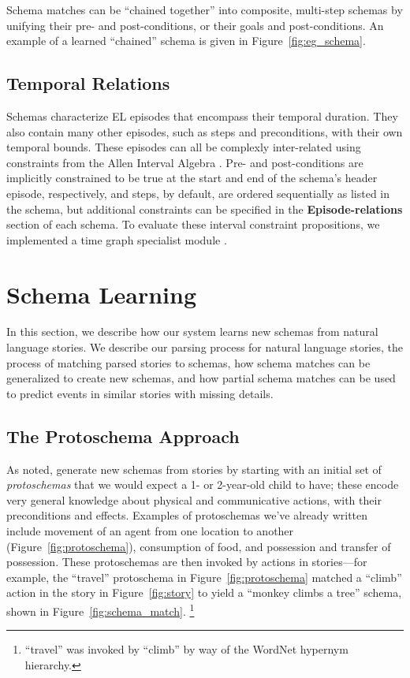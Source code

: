 Schema matches can be ``chained together'' into composite, multi-step schemas by unifying their pre- and post-conditions, or their goals and post-conditions. An example of a learned ``chained'' schema is given in Figure~\ref{fig:eg_schema}.

\subsection{Temporal Relations}
Schemas characterize EL episodes that encompass their temporal duration. They also contain many other episodes, such as steps and preconditions, with their own temporal bounds. These episodes can all be complexly inter-related using constraints from the Allen Interval Algebra \citep{allen1983maintaining}. Pre- and post-conditions are implicitly constrained to be true at the start and end of the schema's header episode, respectively, and steps, by default, are ordered sequentially as listed in the schema, but additional constraints can be specified in the \textbf{Episode-relations} section of each schema. To evaluate these interval constraint propositions, we implemented a time graph specialist module \citep{gerevini1993efficient}.


\section{Schema Learning}
\label{sec:learning}
In this section, we describe how our system learns new schemas from natural language stories. We describe our parsing process for natural language stories, the process of matching parsed stories to schemas, how schema matches can be generalized to create new schemas, and how partial schema matches can be used to predict events in similar stories with missing details.

\subsection{The Protoschema Approach}
As noted, generate new schemas from stories by starting with an initial set of \textit{protoschemas} that we would expect a 1- or 2-year-old child to have; these encode very general knowledge about physical and communicative actions, with their preconditions and effects. Examples of protoschemas we've already written include movement of an agent from one location to another (Figure~\ref{fig:protoschema}), consumption of food, and possession and transfer of possession.
These protoschemas are then invoked by actions in stories---for example, the ``travel'' protoschema in Figure~\ref{fig:protoschema} matched a ``climb'' action in the story in Figure~\ref{fig:story} to yield a ``monkey climbs a tree'' schema, shown in Figure~\ref{fig:schema_match}. \footnote{``travel'' was invoked by ``climb'' by way of the WordNet hypernym hierarchy.}

